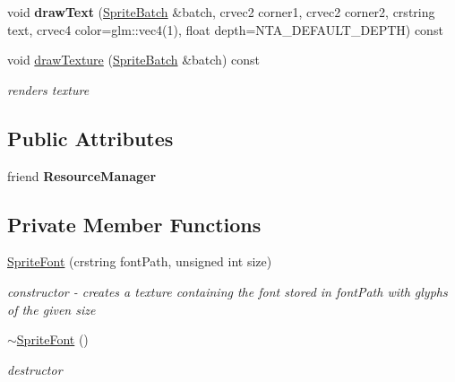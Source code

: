\begin{DoxyCompactItemize}
\mbox{\label{classnta_1_1SpriteFont_aafd62af3ce6a44354c07a372ba6db2fe}} 
void {\bfseries draw\+Text} (\hyperlink{classnta_1_1SpriteBatch}{Sprite\+Batch} \&batch, crvec2 corner1, crvec2 corner2, crstring text, crvec4 color=glm\+::vec4(1), float depth=N\+T\+A\+\_\+\+D\+E\+F\+A\+U\+L\+T\+\_\+\+D\+E\+P\+TH) const
\item 
\mbox{\label{classnta_1_1SpriteFont_ac5e60e0a7b6f9c0302c81f0d5b6628cc}} 
void \hyperlink{classnta_1_1SpriteFont_ac5e60e0a7b6f9c0302c81f0d5b6628cc}{draw\+Texture} (\hyperlink{classnta_1_1SpriteBatch}{Sprite\+Batch} \&batch) const
\begin{DoxyCompactList}\small\item\em renders texture \end{DoxyCompactList}\end{DoxyCompactItemize}
\subsection*{Public Attributes}
\begin{DoxyCompactItemize}
\item 
\mbox{\label{classnta_1_1SpriteFont_a1db301b9555c86340ea57bb2c5485dfc}} 
friend {\bfseries Resource\+Manager}
\end{DoxyCompactItemize}
\subsection*{Private Member Functions}
\begin{DoxyCompactItemize}
\item 
\hyperlink{classnta_1_1SpriteFont_a9dc96f31efd0830dcb476ea87534e358}{Sprite\+Font} (crstring font\+Path, unsigned int size)
\begin{DoxyCompactList}\small\item\em constructor -\/ creates a texture containing the font stored in font\+Path with glyphs of the given size \end{DoxyCompactList}\item 
\mbox{\label{classnta_1_1SpriteFont_aa5292a1131ab6e04e23f282d2b067146}} 
\hyperlink{classnta_1_1SpriteFont_aa5292a1131ab6e04e23f282d2b067146}{$\sim$\+Sprite\+Font} ()
\begin{DoxyCompactList}\small\item\em destructor \end{DoxyCompactList}\end{DoxyCompactItemize}

